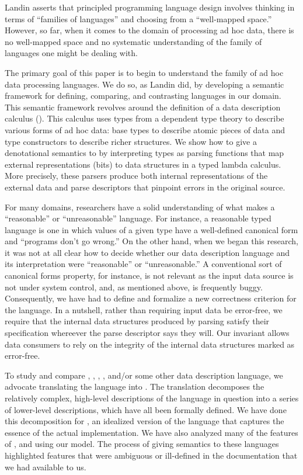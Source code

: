 Landin asserts that principled programming language design
involves thinking in terms of ``families of languages'' and
choosing from a ``well-mapped space.''  However, so far,
when it comes to the domain of processing ad hoc data, 
there is no well-mapped space and no systematic understanding
of the family of languages one might be dealing with.

The primary goal of this paper is to begin to understand the
family of ad hoc data processing languages.  We do so,
as Landin did, by developing a semantic
framework for defining, comparing, and contrasting languages
in our domain.  This semantic framework revolves around the
definition of a data description calculus (\ddc{}).  
This calculus uses types from a dependent type theory to describe
various forms of ad hoc data:
base types to describe atomic pieces of data and
type constructors to describe richer structures.
We show how to give a denotational semantics
to \ddc{} by interpreting
types as parsing functions that map external representations (bits)
to data structures in a typed lambda calculus.  More precisely,
these parsers produce both 
internal representations of the external data and
parse descriptors that pinpoint errors in the original source.

For many domains, researchers have a solid understanding of
what makes a ``reasonable'' or ``unreasonable'' language.  For instance,
a reasonable typed language is one in which values of a given type
have a well-defined canonical form and ``programs don't go wrong.''
On the other hand, when we began this research, it
was not at all clear
how to decide whether our data description language and
its interpretation were ``reasonable'' or ``unreasonable.''  
A conventional sort
of canonical forms property, for instance, 
is not relevant as the input data source
is not under system control, and, as
mentioned above, is frequently buggy.  Consequently,
we have had to define and formalize a new correctness criterion 
for the language. 
In a nutshell, rather than requiring input data be error-free, we require
that the internal data structures produced by parsing 
satisfy their specification whereever the parse descriptor says they
will.  Our invariant allows
data consumers to rely on the integrity of the internal data structures
marked as error-free. 

To study and compare \padsc{}, \padsml{}, \packettypes{},
\datascript{}, and/or some other data description language, we
advocate translating the language into \ddc{}.  The translation
decomposes the relatively complex, high-level descriptions of the
language in question into a series of lower-level \ddc{} descriptions,
which have all been formally defined.  We have done this decomposition
for \ipads{}, an idealized version of the \padsc{} language that
captures the essence of the actual implementation.  We have also
analyzed many of the features of \padsml{}, \packettypes{} and \datascript{}
using our model.  The process of giving semantics to these languages
highlighted features that were ambiguous or ill-defined in the
documentation that we had available to us.

